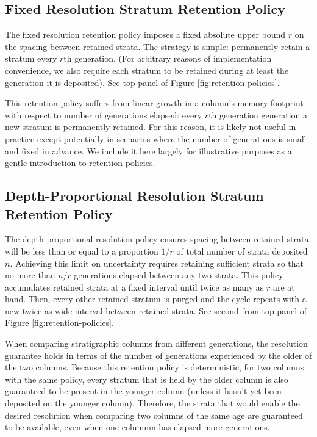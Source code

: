 

\subsection{Fixed Resolution Stratum Retention Policy}

The fixed resolution retention policy imposes a fixed absolute upper bound $r$ on the spacing between retained strata.
The strategy is simple: permanently retain a stratum every $r$th generation.
(For arbitrary reasons of implementation convenience, we also require each stratum to be retained during at least the generation it is deposited).
See top panel of Figure \ref{fig:retention-policies}.

This retention policy suffers from linear growth in a column's memory footprint with respect to number of generations elapsed: every $r$th generation generation a new stratum is permanently retained.
For this reason, it is likely not useful in practice except potentially in scenarios where the number of generations is small and fixed in advance.
We include it here largely for illustrative purposes as a gentle introduction to retention policies.

\subsection{Depth-Proportional Resolution Stratum Retention Policy}

The depth-proportional resolution policy ensures spacing between retained strata will be less than or equal to a proportion $1/r$ of total number of strata deposited $n$.
Achieving this limit on uncertainty requires retaining sufficient strata so that no more than $n/r$ generations elapsed between any two strata.
This policy accumulates retained strata at a fixed interval until twice as many as $r$ are at hand.
Then, every other retained stratum is purged and the cycle repeats with a new twice-as-wide interval between retained strata.
See second from top panel of Figure \ref{fig:retention-policies}.

When comparing stratigraphic columns from different generations, the resolution guarantee holds in terms of the number of generations experienced by the older of the two columns.
Because this retention policy is deterministic, for two columns with the same policy, every stratum that is held by the older column is also guaranteed to be present in the younger column (unless it hasn't yet been deposited on the younger column).
Therefore, the strata that would enable the desired resolution when comparing two columns of the same age are guaranteed to be available, even when one colummn has elapsed more generations.

